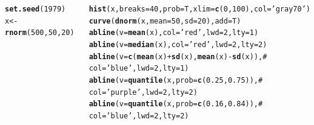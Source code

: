 \documentclass{beamer}\usepackage[]{graphicx}\usepackage[]{color}
\makeatletter
\newcommand{\hlnum}[1]{\textcolor[rgb]{0.686,0.059,0.569}{#1}}%
\newcommand{\hlstr}[1]{\textcolor[rgb]{0.192,0.494,0.8}{#1}}%
\newcommand{\hlcom}[1]{\textcolor[rgb]{0.678,0.584,0.686}{\textit{#1}}}%
\newcommand{\hlopt}[1]{\textcolor[rgb]{0,0,0}{#1}}%
\newcommand{\hlstd}[1]{\textcolor[rgb]{0.345,0.345,0.345}{#1}}%
\newcommand{\hlkwb}[1]{\textcolor[rgb]{0.69,0.353,0.396}{#1}}%
\newcommand{\hlkwc}[1]{\textcolor[rgb]{0.333,0.667,0.333}{#1}}%
\newcommand{\hlkwd}[1]{\textcolor[rgb]{0.737,0.353,0.396}{\textbf{#1}}}%
\newenvironment{kframe}{%
 \def\at@end@of@kframe{}%
 \ifinner\ifhmode%
  \def\at@end@of@kframe{\end{minipage}}%
  \begin{minipage}{\columnwidth}%
 \fi\fi%
 \def\FrameCommand##1{\hskip\@totalleftmargin \hskip-\fboxsep
 \colorbox{shadecolor}{##1}\hskip-\fboxsep
     \hskip-\linewidth \hskip-\@totalleftmargin \hskip\columnwidth}%
 \MakeFramed {\advance\hsize-\width
   \@totalleftmargin\z@ \linewidth\hsize
   \@setminipage}}%
 {\par\unskip\endMakeFramed%
 \at@end@of@kframe}
\newenvironment{knitrout}{}{} %
\renewenvironment{knitrout}{\setlength{\topsep}{0mm}}{}
\makeatother
\begin{document}
\begin{frame}[fragile]%

\begin{columns}[c]


\begin{knitrout}\tiny
{}\color{fgcolor}\begin{kframe}
\begin{alltt}
\hlkwd{set.seed}\hlstd{(}\hlnum{1979}\hlstd{)}
\hlstd{x} \hlkwb{<-} \hlkwd{rnorm}\hlstd{(}\hlnum{500}\hlstd{,}\hlnum{50}\hlstd{,}\hlnum{20}\hlstd{)}

\hlkwd{hist}\hlstd{(x,}\hlkwc{breaks}\hlstd{=}\hlnum{40}\hlstd{,}\hlkwc{prob}\hlstd{=T,}\hlkwc{xlim}\hlstd{=}\hlkwd{c}\hlstd{(}\hlnum{0}\hlstd{,}\hlnum{100}\hlstd{),}\hlkwc{col}\hlstd{=}\hlstr{'gray70'}\hlstd{)}
\hlkwd{curve}\hlstd{(}\hlkwd{dnorm}\hlstd{(x,}\hlkwc{mean}\hlstd{=}\hlnum{50}\hlstd{,} \hlkwc{sd}\hlstd{=}\hlnum{20}\hlstd{),} \hlkwc{add}\hlstd{=T)}
\hlkwd{abline}\hlstd{(}\hlkwc{v}\hlstd{=}\hlkwd{mean}\hlstd{(x),}\hlkwc{col}\hlstd{=}\hlstr{'red'}\hlstd{,}\hlkwc{lwd}\hlstd{=}\hlnum{2}\hlstd{,}\hlkwc{lty}\hlstd{=}\hlnum{1}\hlstd{)}
\hlkwd{abline}\hlstd{(}\hlkwc{v}\hlstd{=}\hlkwd{median}\hlstd{(x),}\hlkwc{col}\hlstd{=}\hlstr{'red'}\hlstd{,}\hlkwc{lwd}\hlstd{=}\hlnum{2}\hlstd{,}\hlkwc{lty}\hlstd{=}\hlnum{2}\hlstd{)}
\hlkwd{abline}\hlstd{(}\hlkwc{v}\hlstd{=}\hlkwd{c}\hlstd{(}\hlkwd{mean}\hlstd{(x)}\hlopt{+}\hlkwd{sd}\hlstd{(x),}\hlkwd{mean}\hlstd{(x)}\hlopt{-}\hlkwd{sd}\hlstd{(x)),}\hlcom{#}
       \hlkwc{col}\hlstd{=}\hlstr{'blue'}\hlstd{,}\hlkwc{lwd}\hlstd{=}\hlnum{2}\hlstd{,}\hlkwc{lty}\hlstd{=}\hlnum{1}\hlstd{)}
\hlkwd{abline}\hlstd{(}\hlkwc{v}\hlstd{=}\hlkwd{quantile}\hlstd{(x,}\hlkwc{prob}\hlstd{=}\hlkwd{c}\hlstd{(}\hlnum{0.25}\hlstd{,}\hlnum{0.75}\hlstd{)),}\hlcom{#}
       \hlkwc{col}\hlstd{=}\hlstr{'purple'}\hlstd{,}\hlkwc{lwd}\hlstd{=}\hlnum{2}\hlstd{,}\hlkwc{lty}\hlstd{=}\hlnum{2}\hlstd{)}
\hlkwd{abline}\hlstd{(}\hlkwc{v}\hlstd{=}\hlkwd{quantile}\hlstd{(x,}\hlkwc{prob}\hlstd{=}\hlkwd{c}\hlstd{(}\hlnum{0.16}\hlstd{,}\hlnum{0.84}\hlstd{)),}\hlcom{#}
       \hlkwc{col}\hlstd{=}\hlstr{'blue'}\hlstd{,}\hlkwc{lwd}\hlstd{=}\hlnum{2}\hlstd{,}\hlkwc{lty}\hlstd{=}\hlnum{2}\hlstd{)}
\end{alltt}
\end{kframe}
\end{knitrout}


\end{columns}
\end{frame}
\end{document}
